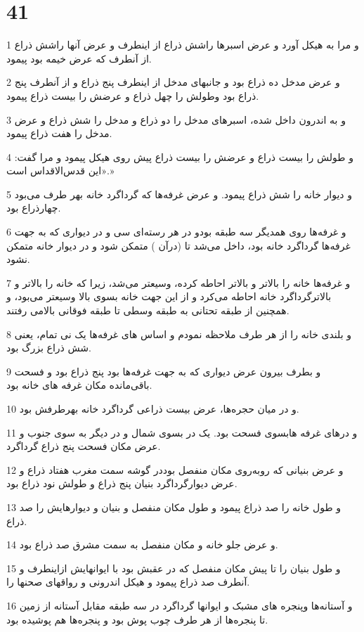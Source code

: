 \chapter{41}

\par 1 و مرا به هیکل آورد و عرض اسبرها راشش ذراع از اینطرف و عرض آنها راشش ذراع از آنطرف که عرض خیمه بود پیمود.
\par 2 و عرض مدخل ده ذراع بود و جانبهای مدخل از اینطرف پنج ذراع و از آنطرف پنج ذراع بود وطولش را چهل ذراع و عرضش را بیست ذراع پیمود.
\par 3 و به اندرون داخل شده، اسبرهای مدخل را دو ذراع و مدخل را شش ذراع و عرض مدخل را هفت ذراع پیمود.
\par 4 و طولش را بیست ذراع و عرضش را بیست ذراع پیش روی هیکل پیمود و مرا گفت: «این قدس‌الاقداس است.»
\par 5 و دیوار خانه را شش ذراع پیمود. و عرض غرفه‌ها که گرداگرد خانه بهر طرف می‌بود چهارذراع بود.
\par 6 و غرفه‌ها روی همدیگر سه طبقه بودو در هر رسته‌ای سی و در دیواری که به جهت غرفه‌ها گرداگرد خانه بود، داخل می‌شد تا (درآن ) متمکن شود و در دیوار خانه متمکن نشود.
\par 7 و غرفه‌ها خانه را بالاتر و بالاتر احاطه کرده، وسیعتر می‌شد، زیرا که خانه را بالاتر و بالاترگرداگرد خانه احاطه می‌کرد و از این جهت خانه بسوی بالا وسیعتر می‌بود، و همچنین از طبقه تحتانی به طبقه وسطی تا طبقه فوقانی بالامی رفتند.
\par 8 و بلندی خانه را از هر طرف ملاحظه نمودم و اساس های غرفه‌ها یک نی تمام، یعنی شش ذراع بزرگ بود.
\par 9 و بطرف بیرون عرض دیواری که به جهت غرفه‌ها بود پنج ذراع بود و فسحت باقی‌مانده مکان غرفه های خانه بود.
\par 10 و در میان حجره‌ها، عرض بیست ذراعی گرداگرد خانه بهرطرفش بود.
\par 11 و درهای غرفه هابسوی فسحت بود. یک در بسوی شمال و در دیگر به سوی جنوب و عرض مکان فسحت پنج ذراع گرداگرد.
\par 12 و عرض بنیانی که رو‌به‌روی مکان منفصل بوددر گوشه سمت مغرب هفتاد ذراع و عرض دیوارگرداگرد بنیان پنج ذراع و طولش نود ذراع بود.
\par 13 و طول خانه را صد ذراع پیمود و طول مکان منفصل و بنیان و دیوارهایش را صد ذراع.
\par 14 و عرض جلو خانه و مکان منفصل به سمت مشرق صد ذراع بود.
\par 15 و طول بنیان را تا پیش مکان منفصل که در عقبش بود با ایوانهایش ازاینطرف و آنطرف صد ذراع پیمود و هیکل اندرونی و رواقهای صحنها را.
\par 16 و آستانه‌ها وپنجره های مشبک و ایوانها گرداگرد در سه طبقه مقابل آستانه از زمین تا پنجره‌ها از هر طرف چوب پوش بود و پنجره‌ها هم پوشیده بود.
